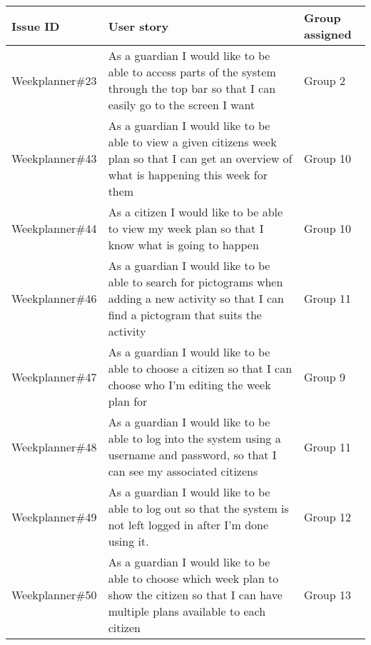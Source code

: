 \begin{table}[H]
    \small
    \begin{tabular}{|p{2.8cm}|p{7cm}|p{2cm}|}
    \hline
    Issue ID        & User story                                                                                                                                                                               & Group assigned      \\ \hline
    Weekplanner\#23 & As a guardian I would like to be able to access parts of the system through the top bar so that I can easily go to the screen I want                                                     & Group 2             \\ \hline
    Weekplanner\#43 & As a guardian I would like to be able to view a given citizens week plan so that I can get an overview of what is happening this week for them                                           & Group 10            \\ \hline
    Weekplanner\#44 & As a citizen I would like to be able to view my week plan so that I know what is going to happen                                                                                         & Group 10            \\ \hline
    Weekplanner\#46 & As a guardian I would like to be able to search for pictograms when adding a new activity so that I can find a pictogram that suits the activity                                         & Group 11            \\ \hline
    Weekplanner\#47 & As a guardian I would like to be able to choose a citizen so that I can choose who I’m editing the week plan for                                                                         & Group 9             \\ \hline
    Weekplanner\#48 & As a guardian I would like to be able to log into the system using a username and password, so that I can see my associated citizens                                                     & Group 11            \\ \hline
    Weekplanner\#49 & As a guardian I would like to be able to log out so that the system is not left logged in after I’m done using it.                                                                       & Group 12            \\ \hline
    Weekplanner\#50 & As a guardian I would like to be able to choose which week plan to show the citizen so that I can have multiple plans available to each citizen                                          & Group 13            \\ \hline

\end{tabular}
\end{table}
